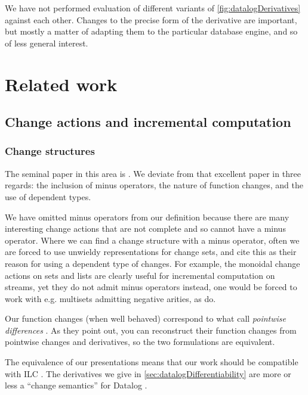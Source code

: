 We have not performed evaluation of different variants of
\cref{fig:datalogDerivatives} against each other. Changes to the precise form of
the derivative are important, but mostly a matter of adapting them to the
particular database engine, and so of less general interest.

\section{Related work}

\subsection{Change actions and incremental computation}

\subsubsection{Change structures}
\label{sec:relatedChangeStructures}

The seminal paper in this area is \textcite{cai2014changes}. We deviate from
that excellent paper in three regards: the
inclusion of minus operators, the nature of function changes, and the use of
dependent types.

We have omitted minus operators from our definition because
there are many interesting change actions that are not complete and so cannot
have a minus operator. Where we can find a change structure with a minus operator, often we are
forced to use unwieldy representations for change sets, and
\citeauthor{cai2014changes} cite this as their reason for using a dependent
type of changes. For example, the monoidal change actions on sets and lists are clearly
useful for incremental computation on streams, yet they do not admit minus
operators \textemdash{} instead, one would
be forced to work with e.g. multisets admitting negative arities, as \citeauthor{cai2014changes} do.

Our function changes (when well behaved) correspond to what \citeauthor{cai2014changes} call
\emph{pointwise differences} \autocite[see][section 2.2]{cai2014changes}. As
they point out, you can reconstruct their
function changes from pointwise changes and derivatives, so the two formulations
are equivalent. 

The equivalence of our presentations means that our work should be compatible
with ILC \autocite[see][section 3]{cai2014changes}. The derivatives we give in \cref{sec:datalogDifferentiability} are more or
less a ``change semantics'' for Datalog \autocite[see][section
3.5]{cai2014changes}. 

